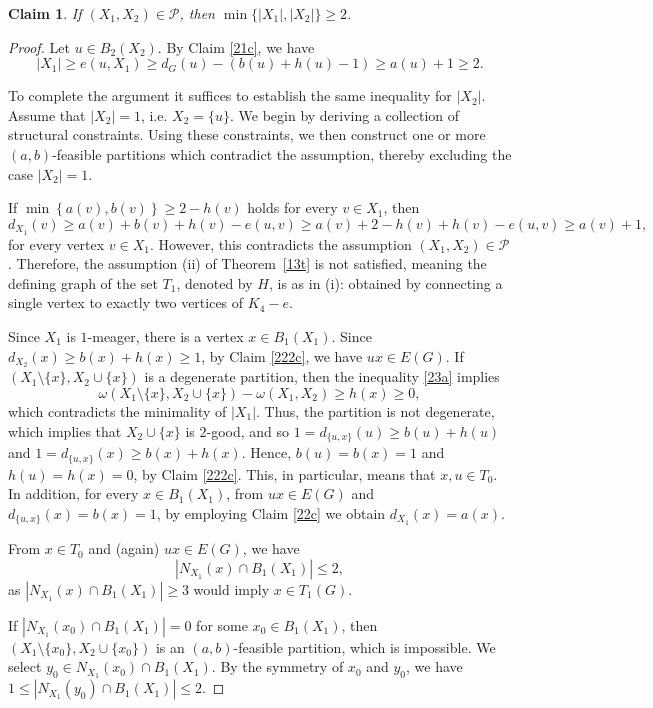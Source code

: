 \documentclass[11p]{elsarticle}
\newtheorem{claim}[theorem]{Claim}
\theoremstyle{definition}
\begin{document}
 \begin{claim}\label{28c}
If $ (X_1,X_2)\in\mathcal{P} $, then 	$\min\{ |X_1|,\left|X_2 \right|\} \ge2 $.
\end{claim}
\begin{proof} Let   $ u\in B_2(X_2) $. By Claim \ref{21c}, we have   $$ \left| X_1 \right|\ge e(u,X_1)\ge d_G(u)-(b(u)+h(u)-1)\ge a(u)+1\ge2.$$ 

To complete the argument it suffices to establish the same inequality for $|X_2|$.  Assume that $|X_2|=1$, i.e. $X_2=\{u\}$.  We begin by deriving a collection of structural constraints. Using these constraints, we then construct one or more $(a,b)$-feasible partitions which contradict the assumption, thereby excluding the case $|X_2|=1$.



If $\min \left\lbrace a(v),b(v)\right\rbrace\ge 2-h(v)$ holds for every $v\in X_1$, then  $$d_{X_1}(v)\ge a(v)+b(v)+h(v)-e(u,v)\ge a(v)+2-h(v)+h(v)-e(u,v)\ge a(v)+1,$$ for every vertex $ v\in X_1 $. However, this contradicts the assumption $(X_1,X_2)\in\mathcal{P}$. Therefore, the assumption (ii) of Theorem~\ref{13t} is not satisfied, meaning the defining graph of the set $T_1$, denoted by $H$, is as in (i): obtained   by connecting a single vertex to exactly two vertices of $ K_{4} -e $. 

   Since $ X_1 $ is $ 1 $-meager, there is a vertex $x\in B_1(X_1)$. Since  $ d_{X_2}(x)\ge b(x)+h(x)\ge 1 $, by Claim \ref{222c},  we have $ux\in E(G)$. If $ (X_1\setminus\{x\}, X_2\cup\{x\}) $ is a degenerate partition, then the inequality \eqref{23a} implies $$ \omega(X_1\setminus\{x\}, X_2\cup\{x\})-\omega(X_1,X_2)\ge h(x)\ge 0,$$ which contradicts  the minimality of $| X_1|$. Thus, the partition is not degenerate, which implies that $X_2\cup\{x\}$ is $2$-good, and so $1=d_{\{u,x\}}(u)\ge b(u)+h(u)$ and
$1=d_{\{u,x\}}(x)\ge b(x)+h(x)$. Hence, $b(u)=b(x)=1$ and $h(u)=h(x)=0$, by Claim \ref{222c}. This, in particular, means that $x,u\in T_0$. In addition, for every  $x\in B_1(X_1)$, from  $ux\in E(G)$  and $d_{\{u,x\}}(x)=b(x)=1$, by employing  Claim \ref{22c} we obtain $d_{X_1}(x)=a(x)$.  


From $x\in T_0$ and (again) $ux\in E(G)$, we have $$\left| N_{X_1}(x)\cap B_1(X_1)\right|\le 2,$$
as  $ \left| N_{X_1}(x)\cap B_1(X_1)\right|\ge 3 $ would imply $ x\in T_1(G) $.

 If $ \left| N_{X_1}(x_0)\cap B_1(X_1)\right|=0$ for some $x_0\in B_1(X_1)$, then $(X_1\setminus \{x_0\}, X_2\cup \{x_0\})$ is an $(a,b)$-feasible partition, which is impossible. We select $y_0\in N_{X_1}(x_0)\cap B_1(X_1)$.  By the symmetry of $x_0$ and $y_0$, we have $1\le  \left| N_{X_1}(y_0)\cap B_1(X_1)\right|\le 2$.


\end{proof}
\end{document}

